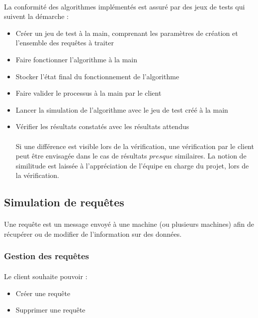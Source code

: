 \documentclass[12pt]{article}
\begin{document}
\paragraph{} La conformité des algorithmes implémentés est assuré par des jeux de tests qui suivent la démarche :
\begin{itemize}
	\item Créer un jeu de test à la main, comprenant les paramètres de création et l'ensemble des requêtes à traiter
	\item Faire fonctionner l'algorithme à la main
	\item Stocker l'état final du fonctionnement de l'algorithme
	\item Faire valider le processus à la main par le client
	\item Lancer la simulation de l'algorithme avec le jeu de test créé à la main
	\item Vérifier les résultats constatés avec les résultats attendus
	
\paragraph{} Si une différence est visible lors de la vérification, une vérification par le client peut être envisagée dans le cas de résultats $presque$ similaires. La notion de similitude est laissée à l'appréciation de l'équipe en charge du projet, lors de la vérification.
\end{itemize}

\subsection{Simulation de requêtes}

\paragraph{} Une requête est un message envoyé à une machine (ou plusieurs machines) afin de récupérer ou de modifier de l'information sur des données.

\subsubsection{Gestion des requêtes}

\paragraph{} Le client souhaite pouvoir :
\begin{itemize}
 \item Créer une requête
 \item Supprimer une requête
\end{itemize}
\end{document}
